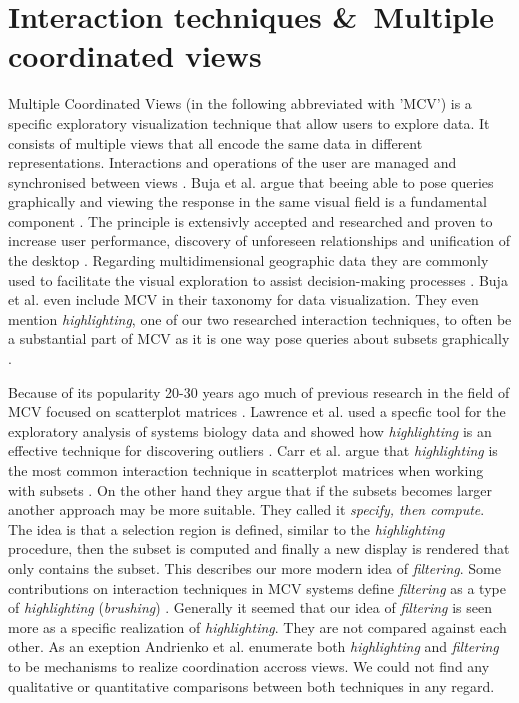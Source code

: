 \section{Interaction techniques \&\ Multiple coordinated views}
Multiple Coordinated Views (in the following abbreviated with ’MCV’) is a specific exploratory visualization technique that allow users to explore data.
It consists of multiple views that all encode the same data in different representations. Interactions and
operations of the user are managed and synchronised between views \citep*{Roberts.722007722007}. Buja et al. argue that
beeing able to pose queries graphically and viewing the response in the same visual field is a fundamental component
\citep*{Buja.1996}. The principle is extensivly accepted and researched and proven to increase user performance, discovery
of unforeseen relationships and unification of the desktop \citep*{North.1998}. Regarding multidimensional geographic data they are
commonly used to facilitate the visual exploration to assist decision-making processes \citep*{Andrienko.2020}.
Buja et al. even include MCV in their taxonomy for data visualization. They even mention \textit{highlighting}, one of our two researched
interaction techniques, to often be a substantial part of MCV as it is one way pose queries about subsets graphically \citep*{Buja.1996}.

Because of its popularity 20-30 years ago much of previous research in the field of MCV focused on
scatterplot matrices \citep*{Carr.1987, Becker.1987}. Lawrence et al. used a specfic tool for the exploratory analysis of systems biology data
and showed how \textit{highlighting} is an effective technique for discovering outliers \citep*{Lawrence.2006}.
Carr et al. argue that \textit{highlighting} is the most common interaction technique in scatterplot matrices
when working with subsets \citep*{Carr.1987, Becker.1987}. On the other hand they argue that if the subsets becomes larger
another approach may be more suitable. They called it \textit{specify, then compute}.
The idea is that a selection region is defined, similar to the \textit{highlighting} procedure, then the subset
is computed and finally a new display is rendered that only contains the subset. This describes our more
modern idea of \textit{filtering}.
Some contributions on interaction techniques in MCV systems define \textit{filtering} as a type of
\textit{highlighting} (\textit{brushing}) \citep*{Ward.}. Generally it seemed that our idea of \textit{filtering} is seen more as a specific
realization of \textit{highlighting}. They are not compared against each other. As an exeption Andrienko et al. enumerate both \textit{highlighting}
and \textit{filtering} to be mechanisms to realize coordination accross views. We could not find any qualitative or quantitative comparisons between
both techniques in any regard.